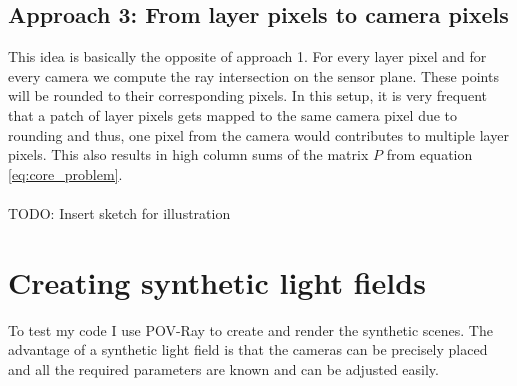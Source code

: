 \documentclass[11pt,a4paper,titlepage]{article}
\begin{document}
\subsection{Approach 3: From layer pixels to camera pixels}
This idea is basically the opposite of approach 1. For every layer pixel and for every camera we compute the ray intersection on the sensor plane. These points will be rounded to their corresponding pixels. In this setup, it is very frequent that a patch of layer pixels gets mapped to the same camera pixel due to rounding and thus, one pixel from the camera would contributes to multiple layer pixels. This also results in high column sums of the matrix $P$ from equation \ref{eq:core_problem}.
\\\\ TODO: Insert sketch for illustration

\section{Creating synthetic light fields}
To test my code I use POV-Ray to create and render the synthetic scenes. The advantage of a synthetic light field is that the cameras can be precisely placed and all the required parameters are known and can be adjusted easily. 

\newpage


\end{document}
